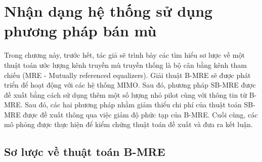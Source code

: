 \clearpage
{}

\setcounter{chapter}{2}
\chapter[{NHẬN DẠNG HỆ THỐNG SỬ DỤNG PHƯƠNG PHÁP BÁN MÙ}]{Nhận dạng hệ thống sử dụng phương pháp bán mù}
\label{sec:MRE}

Trong chương này, trước hết, tác giả sẽ trình bày các tìm hiểu sơ lược về một thuật toán ước lượng kênh truyền mù truyền thống là bộ cân bằng kênh tham chiếu (MRE - Mutually referenced equalizers). Giải thuật B-MRE sẽ được phát triển để hoạt động với các hệ thống MIMO. Sau đó, phương pháp SB-MRE được đề xuất bằng cách sử dụng thêm một số lượng nhỏ pilot cùng với thông tin từ B-MRE. Sau đó, các hai phương pháp nhằm giảm thiểu chi phí của thuật toán SB-MRE được đề xuất thông qua việc giảm độ phức tạp của B-MRE. Cuối cùng, các mô phỏng được thực hiện để kiểm chứng thuật toán đề xuất và đưa ra kết luận.

\section{Sơ lược về thuật toán B-MRE}

